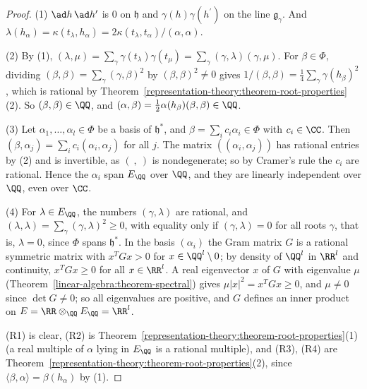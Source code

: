 \begin{proof}
(1) $\ad h\,\ad h^{\prime}$ is $0$ on $\mathfrak{h}$ and $\gamma(h)\gamma(h^{\prime})$ on the line $\mathfrak{g}_\gamma$. And
$\lambda(h_\alpha) = \kappa(t_\lambda, h_\alpha) = 2\kappa(t_\lambda, t_\alpha)/(\alpha, \alpha)$.

(2) By (1), $(\lambda, \mu) = \sum_\gamma\gamma(t_\lambda)\gamma(t_\mu) = \sum_\gamma(\gamma, \lambda)(\gamma, \mu)$. For $\beta \in \Phi$, dividing
$(\beta, \beta) = \sum_\gamma(\gamma, \beta)^2$ by $(\beta, \beta)^2 \neq 0$ gives $1/(\beta, \beta) = \frac14\sum_\gamma\gamma(h_\beta)^2$, which is rational by
Theorem~\ref{representation-theory:theorem-root-properties}(2). So $(\beta, \beta) \in \QQ$, and $(\alpha, \beta) = \frac12\alpha(h_\beta)(\beta, \beta) \in \QQ$.

(3) Let $\alpha_1, \ldots, \alpha_l \in \Phi$ be a basis of $\mathfrak{h}^*$, and $\beta = \sum_ic_i\alpha_i \in \Phi$ with $c_i \in \CC$. Then
$(\beta, \alpha_j) = \sum_ic_i(\alpha_i, \alpha_j)$ for all $j$. The matrix $((\alpha_i, \alpha_j))$ has rational entries by (2) and is invertible, as $(\ ,\ )$ is nondegenerate;
so by Cramer's rule the $c_i$ are rational. Hence the $\alpha_i$ span $E_\QQ$ over $\QQ$, and they are linearly independent over $\QQ$, even over $\CC$.

(4) For $\lambda \in E_\QQ$, the numbers $(\gamma, \lambda)$ are rational, and $(\lambda, \lambda) = \sum_\gamma(\gamma, \lambda)^2 \geq 0$, with equality only if
$(\gamma, \lambda) = 0$ for all roots $\gamma$, that is, $\lambda = 0$, since $\Phi$ spans $\mathfrak{h}^*$. In the basis $(\alpha_i)$ the Gram matrix $G$ is a rational symmetric matrix
with $x^TGx > 0$ for $x \in \QQ^l \setminus 0$; by density of $\QQ^l$ in $\RR^l$ and continuity, $x^TGx \geq 0$ for all $x \in \RR^l$. A real eigenvector $x$ of $G$ with eigenvalue $\mu$
(Theorem~\ref{linear-algebra:theorem-spectral}) gives $\mu|x|^2 = x^TGx \geq 0$, and $\mu \neq 0$ since $\det G \neq 0$; so all eigenvalues are positive, and $G$ defines an inner product on
$E = \RR \otimes_\QQ E_\QQ = \RR^l$.

(R1) is clear, (R2) is Theorem~\ref{representation-theory:theorem-root-properties}(1) (a real multiple of $\alpha$ lying in $E_\QQ$ is a rational multiple), and (R3), (R4) are
Theorem~\ref{representation-theory:theorem-root-properties}(2), since $\langle\beta, \alpha\rangle = \beta(h_\alpha)$ by (1).
\end{proof}

